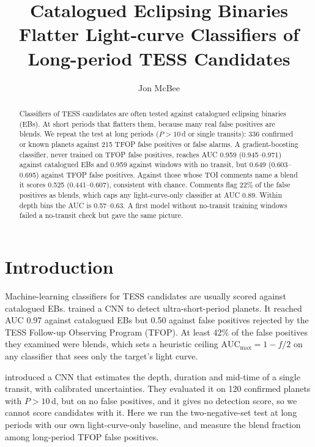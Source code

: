 \documentclass{aastex701}
\begin{document}
\title{Catalogued Eclipsing Binaries Flatter Light-curve Classifiers of Long-period TESS Candidates}

\author[orcid=0009-0000-7524-4470]{Jon McBee}

\begin{abstract}
Classifiers of TESS candidates are often tested against catalogued eclipsing binaries (EBs). At short periods that
flatters them, because many real false positives are blends. We repeat the test at long periods ($P>10$\,d or single
transits): 336 confirmed or known planets against 215 TFOP false positives or false alarms. A gradient-boosting
classifier, never trained on TFOP false positives, reaches AUC 0.959 (0.945--0.971) against catalogued EBs and 0.959
against windows with no transit, but 0.649 (0.603--0.695) against TFOP false positives. Against those whose TOI
comments name a blend it scores 0.525 (0.441--0.607), consistent with chance. Comments flag 22\% of the false
positives as blends, which caps any light-curve-only classifier at AUC 0.89. Within depth bins the AUC is 0.57--0.63.
A first model without no-transit training windows failed a no-transit check but gave the same picture.
\end{abstract}


\section{Introduction}

Machine-learning classifiers for TESS candidates are usually scored against catalogued EBs.
\citet{PagesNavarrete2026} trained a CNN to detect ultra-short-period planets. It reached AUC 0.97 against
catalogued EBs but 0.50 against false positives rejected by the TESS Follow-up Observing Program (TFOP). At least
42\% of the false positives they examined were blends, which sets a heuristic ceiling $\mathrm{AUC_{max}}=1-f/2$ on
any classifier that sees only the target's light curve.

\citet{Salinas2026} introduced a CNN that estimates the depth, duration and mid-time of a single transit, with
calibrated uncertainties. They evaluated it on 120 confirmed planets with $P>10$\,d, but on no false positives, and
it gives no detection score, so we cannot score candidates with it. Here we run the two-negative-set test at long
periods with our own light-curve-only baseline, and measure the blend fraction among long-period TFOP false
positives.
\end{document}
